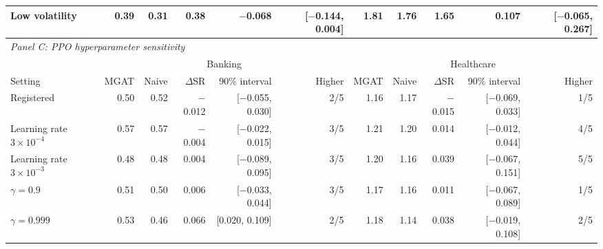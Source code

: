 \begin{table}[!t]
{\begin{tabular}{lrrrrrrrrrr}
Low volatility & 0.39 & 0.31 & 0.38 & $-$0.068 & [$-$0.144, 0.004] & 1.81 & 1.76 & 1.65 & 0.107 & [$-$0.065, 0.267] \\
\midrule
\multicolumn{11}{l}{\textit{Panel C: PPO hyperparameter sensitivity}} \\
 & \multicolumn{5}{c}{Banking} & \multicolumn{5}{c}{Healthcare} \\ \cmidrule(lr){2-6}\cmidrule(lr){7-11}
Setting & MGAT & Naive & $\Delta$SR & 90\% interval & Higher & MGAT & Naive & $\Delta$SR & 90\% interval & Higher \\ \midrule
Registered & 0.50 & 0.52 & $-$0.012 & [$-$0.055, 0.030] & 2/5 & 1.16 & 1.17 & $-$0.015 & [$-$0.069, 0.033] & 1/5 \\
Learning rate $3\times10^{-4}$ & 0.57 & 0.57 & $-$0.004 & [$-$0.022, 0.015] & 3/5 & 1.21 & 1.20 & 0.014 & [$-$0.012, 0.044] & 4/5 \\
Learning rate $3\times10^{-3}$ & 0.48 & 0.48 & 0.004 & [$-$0.089, 0.095] & 3/5 & 1.20 & 1.16 & 0.039 & [$-$0.067, 0.151] & 5/5 \\
$\gamma=0.9$ & 0.51 & 0.50 & 0.006 & [$-$0.033, 0.044] & 3/5 & 1.17 & 1.16 & 0.011 & [$-$0.067, 0.089] & 1/5 \\
$\gamma=0.999$ & 0.53 & 0.46 & 0.066 & [0.020, 0.109] & 2/5 & 1.18 & 1.14 & 0.038 & [$-$0.019, 0.108] & 2/5 \\
\bottomrule\end{tabular}}
\end{table}
